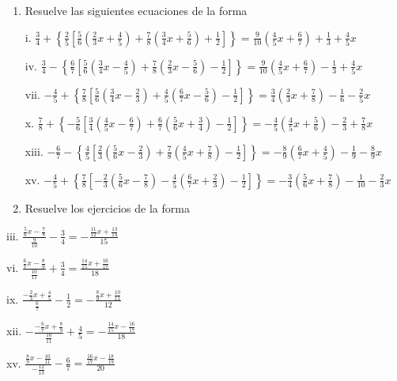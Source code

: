 \documentclass[]{book}
\providecommand{\tightlist}{%
  \setlength{\itemsep}{0pt}\setlength{\parskip}{0pt}}
\begin{document}
\begin{enumerate}
\def\labelenumi{\arabic{enumi}.}
\setcounter{enumi}{3}
\tightlist
\item
  Resuelve las siguientes ecuaciones de la forma

  \begin{multicols}{2}
  i. $\frac{3}{4}+\left\{\frac{2}{5}[\frac{5}{6}(\frac{2}{3}x+\frac{4}{5})+\frac{7}{8}(\frac{3}{4}x+\frac{5}{6})+\frac{1}{2}]\right\}=\frac{9}{10}(\frac{4}{5}x+\frac{6}{7})+\frac{1}{3}+\frac{4}{5}x$

  iv. $\frac{3}{4}-\left\{\frac{6}{7}[\frac{5}{6}(\frac{3}{4}x-\frac{4}{5})+\frac{7}{8}(\frac{2}{3}x-\frac{5}{6})-\frac{1}{2}]\right\}=\frac{9}{10}(\frac{4}{5}x+\frac{6}{7})-\frac{1}{3}+\frac{4}{5}x$

  vii. $-\frac{4}{5}+\left\{\frac{7}{8}[\frac{5}{6}(\frac{3}{4}x-\frac{2}{3})+\frac{4}{5}(\frac{6}{7}x-\frac{5}{6})-\frac{1}{2}]\right\}=\frac{3}{4}(\frac{2}{3}x+\frac{7}{8})-\frac{1}{6}-\frac{2}{5}x$

  x. $\frac{7}{8}+\left\{-\frac{5}{6}[\frac{3}{4}(\frac{4}{5}x-\frac{6}{7})+\frac{6}{7}(\frac{5}{6}x+\frac{3}{4})-\frac{1}{2}]\right\}=-\frac{4}{5}(\frac{4}{5}x+\frac{5}{6})-\frac{2}{3}+\frac{7}{8}x$

  xiii. $-\frac{6}{7}-\left\{\frac{4}{5}[\frac{2}{3}(\frac{5}{6}x-\frac{2}{3})+\frac{7}{8}(\frac{4}{5}x+\frac{7}{8})-\frac{1}{2}]\right\}=-\frac{8}{9}(\frac{6}{7}x+\frac{4}{5})-\frac{1}{9}-\frac{8}{9}x$

  xv. $-\frac{4}{5}+\left\{\frac{7}{8}[-\frac{2}{3}(\frac{5}{6}x-\frac{7}{8})-\frac{4}{5}(\frac{6}{7}x+\frac{2}{3})-\frac{1}{2}]\right\}=-\frac{3}{4}(\frac{5}{6}x+\frac{7}{8})-\frac{1}{10}-\frac{2}{3}x$
  \end{multicols}
\item
  Resuelve los ejercicios de la forma
\end{enumerate}

\begin{multicols}{2}
    iii. $\frac{\frac{5}{6}x-\frac{7}{8}}{\frac{9}{10}}-\frac{3}{4}=-\frac{\frac{11}{12}x+\frac{13}{14}}{15}$

    vi. $\frac{\frac{6}{7}x-\frac{8}{9}}{\frac{10}{11}}+\frac{3}{4}=\frac{\frac{14}{15}x+\frac{16}{17}}{18}$

    ix. $\frac{-\frac{2}{3}x+\frac{4}{5}}{\frac{6}{7}}-\frac{1}{2}=-\frac{\frac{8}{9}x+\frac{10}{11}}{12}$

    xii. $-\frac{-\frac{6}{7}x+\frac{8}{9}}{\frac{10}{11}}+\frac{4}{5}=-\frac{\frac{14}{15}x-\frac{16}{17}}{18}$

    xv. $\frac{\frac{8}{9}x-\frac{10}{11}}{-\frac{12}{13}}-\frac{6}{7}=\frac{\frac{16}{17}x-\frac{18}{19}}{20}$
\end{multicols}
\end{document}
